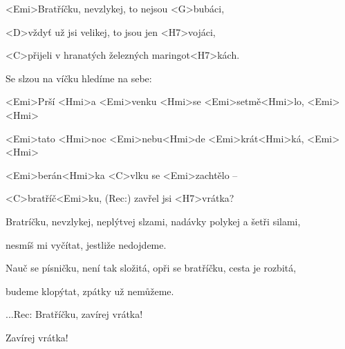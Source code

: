 

\zs
<Emi>Bratříčku, nevzlykej, to nejsou <G>bubáci,

<D>vždyť už jsi velikej, to jsou jen <H7>vojáci,

<C>přijeli v hranatých železných maringot<H7>kách.

Se slzou na víčku hledíme na sebe:

\ks

\zr
<Emi>Prší <Hmi>a <Emi>venku <Hmi>se <Emi>setmě<Hmi>lo, <Emi> <Hmi>

<Emi>tato <Hmi>noc <Emi>nebu<Hmi>de <Emi>krát<Hmi>ká, <Emi> <Hmi>

<Emi>berán<Hmi>ka <C>vlku se <Emi>zachtělo --

<C>bratříč<Emi>ku, (Rec:) zavřel jsi <H7>vrátka?
\kr

\zs
Bratríčku, nevzlykej, neplýtvej slzami, nadávky polykej a šetři silami,

nesmíš mi vyčítat, jestliže nedojdeme.

Nauč se písničku, není tak složitá, opři se bratříčku, cesta je rozbitá,

budeme klopýtat, zpátky už nemůžeme.
\ks

\zr
...Rec: Bratříčku, zavírej vrátka!

Zavírej vrátka!
\kr

\kp
